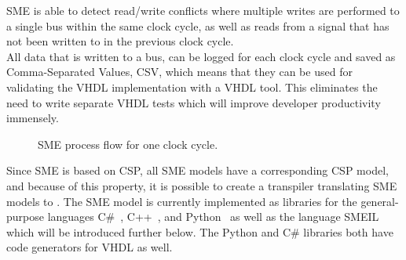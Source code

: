 SME is able to detect read/write conflicts where multiple writes are performed to a single bus within the same clock cycle, as well as reads from a signal that has not been written to in the previous clock cycle.\\

All data that is written to a bus, can be logged for each clock cycle and saved as Comma-Separated Values, CSV, which means that they can be used for validating the VHDL implementation with a VHDL tool. This eliminates the need to write separate VHDL tests which will improve developer productivity immensely.\\


\begin{figure}[!ht]
  \centering
  \caption{SME process flow for one clock cycle.}
  \label{fig:sme_process_flow}
\end{figure}
Since SME is based on CSP, all SME models have a
corresponding CSP model, and because of this property, it is possible to create a transpiler translating SME models to \cspm{}.
The SME model is currently implemented as libraries for the general-purpose languages C\#~\cite{Skovhede}, C++~\cite{asheim2015}, and Python~\cite{asheim2016vhdl} as well as the language SMEIL which will be introduced further below. The Python and C\# libraries both have code generators for VHDL as well.
